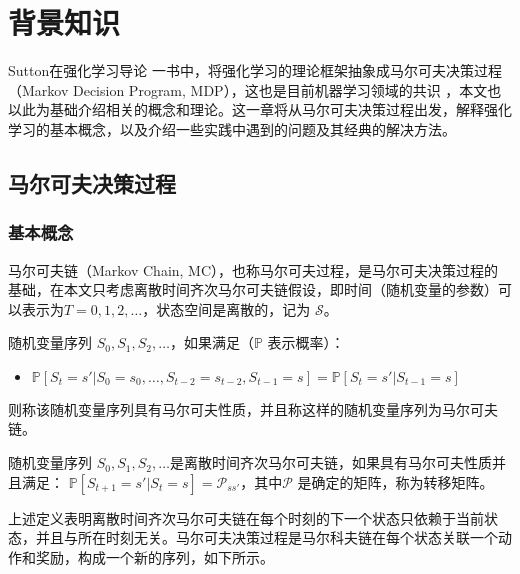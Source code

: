 
\chapter{背景知识}
\label{cha:background-knowledge}


Sutton在强化学习导论 \cite{suttonReinforcementLearningIntroduction2018}一书中，将强化学习的理论框架抽象成马尔可夫决策过程（Markov Decision Program, MDP），这也是目前机器学习领域的共识 \cite{mnihHumanlevelControlDeep2015} \cite{mnihAsynchronousMethodsDeep2016} \cite{hesselRainbowCombiningImprovements2018}  ，本文也以此为基础介绍相关的概念和理论。这一章将从马尔可夫决策过程出发，解释强化学习的基本概念，以及介绍一些实践中遇到的问题及其经典的解决方法。

\section{马尔可夫决策过程}
\subsection{基本概念}
马尔可夫链（Markov Chain, MC），也称马尔可夫过程，是马尔可夫决策过程的基础，在本文只考虑离散时间齐次马尔可夫链假设，即时间（随机变量的参数）可以表示为$T = {0, 1, 2, \dots}$，状态空间是离散的，记为 $\mathcal{S}$。

\begin{definition}[马尔可夫链]
    随机变量序列 $S_0, S_1, S_2, \dots$，如果满足（$\mathbb{P}$ 表示概率）：
    \begin{itemize}
        \item[] $\mathbb{P} [S_{t} = s' |S_0 = s_0, \dots, S_{t-2} = s_{t-2}, S_{t-1} = s] = \mathbb{P} [S_{t} = s' | S_{t-1} = s]$
    \end{itemize}
    则称该随机变量序列具有马尔可夫性质，并且称这样的随机变量序列为马尔可夫链。
\end{definition}

\begin{definition}[离散时间齐次马尔可夫链]
    随机变量序列 $S_0, S_1, S_2, \dots$是离散时间齐次马尔可夫链，如果具有马尔可夫性质并且满足：
    $\mathbb{P} [S_{t+1} = s' | S_t = s] = \mathcal{P}_{ss'}$，其中$\mathcal{P}$ 是确定的矩阵，称为转移矩阵。
\end{definition}

上述定义表明离散时间齐次马尔可夫链在每个时刻的下一个状态只依赖于当前状态，并且与所在时刻无关。马尔可夫决策过程是马尔科夫链在每个状态关联一个动作和奖励，构成一个新的序列，如下所示。

